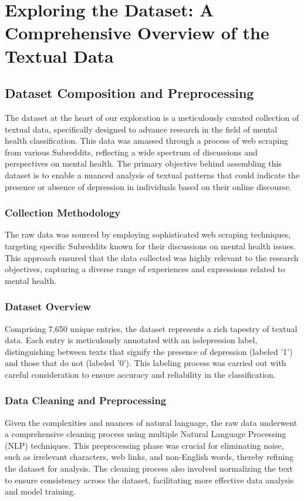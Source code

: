 \chapter{Exploring the Dataset: A Comprehensive Overview of the Textual Data}
\label{chap:ch1}

\par
\section{Dataset Composition and Preprocessing}

\quad The dataset at the heart of our exploration is a meticulously curated collection of textual data, specifically designed to advance research in the field of mental health classification. This data was amassed through a process of web scraping from various Subreddits, reflecting a wide spectrum of discussions and perspectives on mental health. The primary objective behind assembling this dataset is to enable a nuanced analysis of textual patterns that could indicate the presence or absence of depression in individuals based on their online discourse.

\subsection{Collection Methodology}
\quad The raw data was sourced by employing sophisticated web scraping techniques, targeting specific Subreddits known for their discussions on mental health issues. This approach ensured that the data collected was highly relevant to the research objectives, capturing a diverse range of experiences and expressions related to mental health.

\subsection{Dataset Overview}
\quad Comprising 7,650 unique entries, the dataset represents a rich tapestry of textual data. Each entry is meticulously annotated with an is\textunderscore depression label, distinguishing between texts that signify the presence of depression (labeled '1') and those that do not (labeled '0'). This labeling process was carried out with careful consideration to ensure accuracy and reliability in the classification.

\subsection{Data Cleaning and Preprocessing}
\quad Given the complexities and nuances of natural language, the raw data underwent a comprehensive cleaning process using multiple Natural Language Processing (NLP) techniques. This preprocessing phase was crucial for eliminating noise, such as irrelevant characters, web links, and non-English words, thereby refining the dataset for analysis. The cleaning process also involved normalizing the text to ensure consistency across the dataset, facilitating more effective data analysis and model training.

